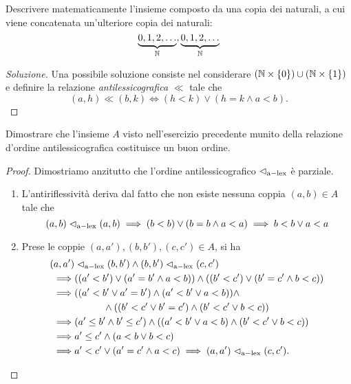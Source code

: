 \begin{exe}
  Descrivere matematicamente l'insieme composto da una copia dei naturali, a cui viene concatenata un'ulteriore copia dei naturali:
  \[
  \underbrace{0,1,2,\dots}_{\mathbb{N}},\underbrace{0,1,2,\dots}_{\mathbb{N}}
  \]
\end{exe}
\begin{proof}[Soluzione]
  Una possibile soluzione consiste nel considerare \((\mathbb{N} \times \lbrace 0 \rbrace) \cup (\mathbb{N} \times \lbrace 1 \rbrace)\) e definire la relazione \emph{antilessicografica} \(\ll\) tale che
  \begin{equation}
    (a,h) \ll (b,k) \iff (h < k) \lor (h = k \land a < b).
  \end{equation}
\end{proof}
\begin{exe}
  Dimostrare che l'insieme \(A\) visto nell'esercizio precedente munito della relazione d'ordine antilessicografica costituisce un buon ordine.
\end{exe}
\begin{proof}
  Dimostriamo anzitutto che l'ordine antilessicografico \(\vartriangleleft_{\mathrm{a-lex}}\) è parziale.
  \begin{enumerate}
    \item L'antiriflessività deriva dal fatto che non esiste nessuna coppia \((a,b) \in A\) tale che
    \[
    (a,b) \vartriangleleft_{\mathrm{a-lex}} (a, b) \implies (b < b) \lor (b = b \land a < a) \implies b < b \lor a < a
    \]
    \item Prese le coppie \((a,a'), (b,b'), (c,c') \in A\), si ha
    \begin{align*}
    (a,a') &\vartriangleleft_{\mathrm{a-lex}} (b,b') \land (b,b') \vartriangleleft_{\mathrm{a-lex}} (c,c') \\
    \implies & ((a' < b') \lor (a' = b' \land a < b)) \land ((b' < c') \lor (b' = c' \land b < c)) \\
    \implies & ((a' < b' \lor a' = b') \land (a' < b' \lor a < b)) \land\\
    & \quad\quad\quad \land ((b' < c' \lor b' = c') \land (b' < c' \lor b < c)) \\
    \implies & (a' \le b' \land b' \le c') \land ((a' < b' \lor a < b) \land (b' < c' \lor b < c)) \\
    \implies & a' \le c' \land (a < b \lor b < c) \\
    \implies & a' < c' \lor (a' = c' \land a < c) \implies (a,a') \vartriangleleft_{\mathrm{a-lex}} (c,c').
    \end{align*}
  \end{enumerate}
\end{proof}

